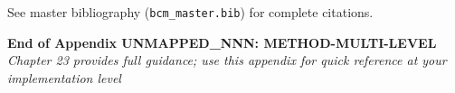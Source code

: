 See master bibliography (\texttt{bcm\_master.bib}) for complete citations.

\nocite{bcm_master}


\vspace{2cm}
\begin{center}
{\large \textbf{End of Appendix UNMAPPED_NNN: METHOD-MULTI-LEVEL}} \\
\vspace{0.5cm}
{\small \textit{Chapter 23 provides full guidance; use this appendix for quick reference at your implementation level}}
\end{center}

